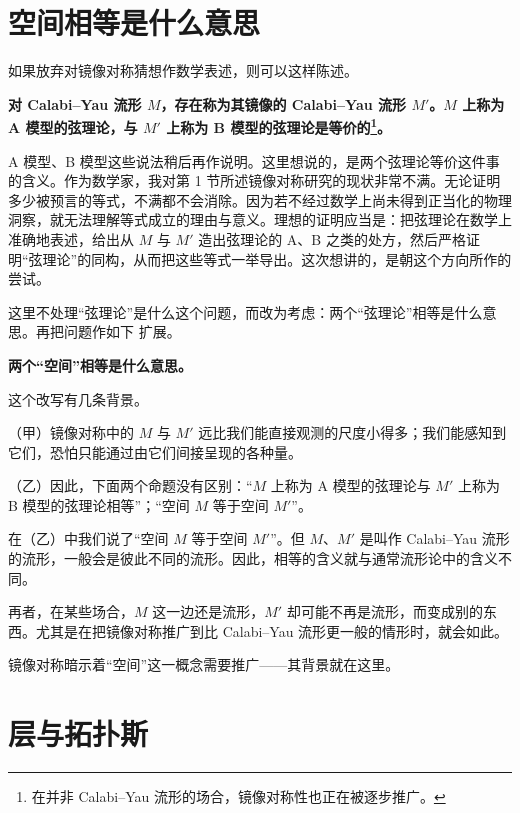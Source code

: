 \section{空间相等是什么意思}

如果放弃对镜像对称猜想作数学表述，则可以这样陈述。

\par\medskip
\noindent\textbf{对 Calabi--Yau 流形 $M$，存在称为其镜像的 Calabi--Yau 流形 $M'$。$M$ 上称为 A 模型的弦理论，与 $M'$ 上称为 B 模型的弦理论是等价的\footnote{在并非 Calabi--Yau 流形的场合，镜像对称性也正在被逐步推广。}。}
\par\medskip

A 模型、B 模型这些说法稍后再作说明。这里想说的，是两个弦理论等价这件事的含义。作为数学家，我对第 1 节所述镜像对称研究的现状非常不满。无论证明多少被预言的等式，不满都不会消除。因为若不经过数学上尚未得到正当化的物理洞察，就无法理解等式成立的理由与意义。理想的证明应当是：把弦理论在数学上准确地表述，给出从 $M$ 与 $M'$ 造出弦理论的 A、B 之类的处方，然后严格证明“弦理论”的同构，从而把这些等式一举导出。这次想讲的，是朝这个方向所作的尝试。

这里不处理“弦理论”是什么这个问题，而改为考虑：两个“弦理论”相等是什么意思。再把问题作如下
扩展。

\par\medskip
\noindent\textbf{两个“空间”相等是什么意思。}
\par\medskip

这个改写有几条背景。

（甲）镜像对称中的 $M$ 与 $M'$ 远比我们能直接观测的尺度小得多；我们能感知到它们，恐怕只能通过由它们间接呈现的各种量。

（乙）因此，下面两个命题没有区别：“$M$ 上称为 A 模型的弦理论与 $M'$ 上称为 B 模型的弦理论相等”；“空间 $M$ 等于空间 $M'$”。

在（乙）中我们说了“空间 $M$ 等于空间 $M'$”。但 $M$、$M'$ 是叫作 Calabi--Yau 流形的流形，一般会是彼此不同的流形。因此，相等的含义就与通常流形论中的含义不同。

再者，在某些场合，$M$ 这一边还是流形，$M'$ 却可能不再是流形，而变成别的东西。尤其是在把镜像对称推广到比 Calabi--Yau 流形更一般的情形时，就会如此。

镜像对称暗示着“空间”这一概念需要推广——其背景就在这里。

\section{层与拓扑斯}

